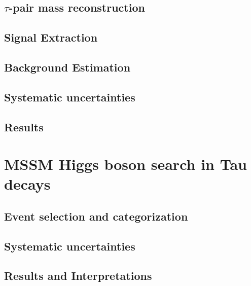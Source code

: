 \subsection{$\tau$-pair mass reconstruction}

\subsection{Signal Extraction}

\subsection{Background Estimation}

\subsection{Systematic uncertainties}

\subsection{Results}

\section{MSSM Higgs boson search in Tau decays}

\subsection{Event selection and categorization}

\subsection{Systematic uncertainties}

\subsection{Results and Interpretations}


